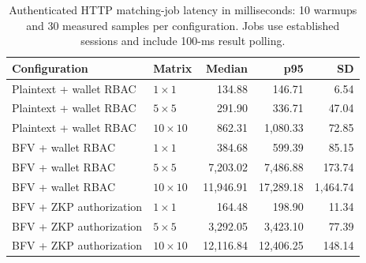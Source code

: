 \begin{table}[t]
\centering\scriptsize
\caption{Authenticated HTTP matching-job latency in milliseconds: 10 warmups and 30 measured samples per configuration. Jobs use established sessions and include 100-ms result polling.}
\label{tab:workloads}
\renewcommand{\arraystretch}{1.12}
\begin{tabularx}{\textwidth}{>{\raggedright\arraybackslash}Xlrrr}
\toprule Configuration & Matrix & Median & p95 & SD\\\midrule
Plaintext + wallet RBAC & $1\times1$ & 134.88 & 146.71 & 6.54\\
Plaintext + wallet RBAC & $5\times5$ & 291.90 & 336.71 & 47.04\\
Plaintext + wallet RBAC & $10\times10$ & 862.31 & 1,080.33 & 72.85\\
BFV + wallet RBAC & $1\times1$ & 384.68 & 599.39 & 85.15\\
BFV + wallet RBAC & $5\times5$ & 7,203.02 & 7,486.88 & 173.74\\
BFV + wallet RBAC & $10\times10$ & 11,946.91 & 17,289.18 & 1,464.74\\
BFV + ZKP authorization & $1\times1$ & 164.48 & 198.90 & 11.34\\
BFV + ZKP authorization & $5\times5$ & 3,292.05 & 3,423.10 & 77.39\\
BFV + ZKP authorization & $10\times10$ & 12,116.84 & 12,406.25 & 148.14\\
\bottomrule\end{tabularx}
\end{table}
